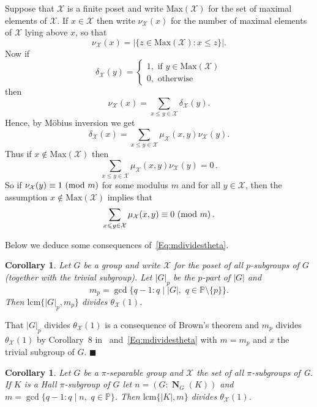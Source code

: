 \documentclass[a4paper,12pt,reqno]{amsart}
\newtheorem{corollary}[theorem]{Corollary}
\numberwithin{equation}{section}
\DeclareMathOperator{\N}{\mathbf{N}}
\newcommand{\card}[1]{\left\lvert{#1}\right\rvert}
\renewcommand{\leq}{\leqslant}
\newcommand{\md}[1]{\,\left(\textnormal{mod}\ #1\right)}
\newenvironment{proofof}{{\bf {Proof.} }}{\hfill $\blacksquare$ \\}
\begin{document}
Suppose that $\mathcal{X}$ is a finite poset and write $\mathrm{Max}(\mathcal{X})$ for the set of maximal elements of $\mathcal{X}$. 
If $x \in \mathcal{X}$ then write $\nu_{\mathcal{X}}(x)$ 
for the number of maximal elements of $\mathcal{X}$ lying above $x$, so that
\[
\nu_{\mathcal{X}}(x) = \card{\{ z \in \mathrm{Max}(\mathcal{X}) : x \leq z\}}.
\]
Now if 
\[
\delta_{\mathcal{X}}(y) = \left\{\begin{array}{l}
1, \text { if } y \in \mathrm{Max}(\mathcal{X})\\
0, \text { otherwise }
\end{array}\right.
\]
then  
\[
\nu_{\mathcal{X}}(x) = \sum_{x \leq y  \in \mathcal{X}} \delta_{\mathcal{X}}(y).
\]
Hence, by M\"{o}bius inversion we get
\[
\delta_{\mathcal{X}}(x)= \sum_{x \leq y \in \mathcal{X}}\mu_{\mathcal{X}}(x, y) \nu_{\mathcal{X}}(y).
\]
Thus if $x \notin \mathrm{Max}(\mathcal{X})$ then 
\[
\sum_{x \leq y \in \mathcal{X}}\mu_{\mathcal{X}}(x, y) \nu_{\mathcal{X}}(y) = 0\,.
\]
So if $\nu_{\mathcal{X}}(y) \equiv 1 \md{m}$ for some modulus $m$ and for all $y \in \mathcal{X}$, 
then the assumption $x \notin \mathrm{Max}(\mathcal{X})$ implies that
\begin{equation}\label{Eq:mdividestheta}
\sum_{x \leq y \in \mathcal{X} }\mu_{\mathcal{X}}(x, y) \equiv 0 \md{m}.    
\end{equation}

Below we deduce some consequences  of~\eqref{Eq:mdividestheta}.


\begin{corollary}\label{Cor:First}
Let $G$ be a group and write $\mathcal{X}$ for the poset of all $p$-subgroups of $G$
(together with the trivial subgroup).
Let $\card{G}_p$ be the $p$-part of $|G|$ 
and 
\[
m_p = \gcd\{q - 1 : q \mid \card{G},\,\,q \in \mathbb{P}\setminus \{p\}\}.
\]
Then $\mathrm{lcm}\{\card{G}_p, m_p\}$ divides $\theta_{\mathcal{X}}(1)$.
\end{corollary}

\begin{proofof}
That $\card{G}_p$ divides $\theta_{\mathcal{X}}(1)$ is a consequence of Brown's theorem
and $m_p$ divides $\theta_{\mathcal{X}}(1)$ 
by Corollary~8 in~\cite{congruences} and~\eqref{Eq:mdividestheta} with $m = m_p$
and $x$ the trivial subgroup of $G$.
\end{proofof}

\begin{corollary}\label{Cor:Second}
Let $G$ be a $\pi$-separable group and  $\mathcal{X}$  the set of all $\pi$-subgroups of G. If  $K$  is a Hall $\pi$-subgroup of $G$ let $n = (G : \N_G(K))$ and $m = \gcd\{q - 1 : q \mid n,\,\, q \in \mathbb{P}\}$.
Then $\mathrm{lcm}\{|K|, m\}$ divides $\theta_{\mathcal{X}}(1)$.
\end{corollary}
\end{document}
